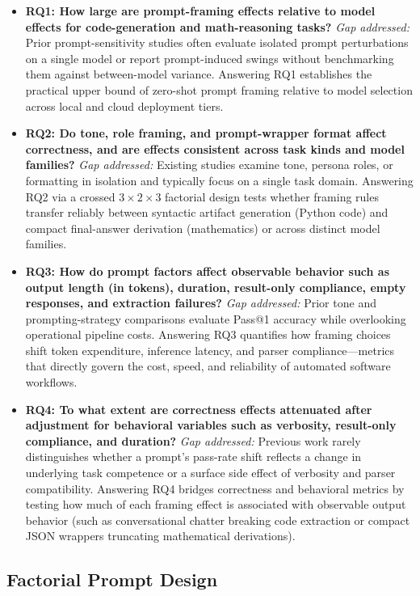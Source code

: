 \documentclass[a4paper,fleqn]{cas-sc}
\providecommand{\tightlist}{%
  \setlength{\itemsep}{0pt}\setlength{\parskip}{0pt}}
\begin{document}
\begin{itemize}
\tightlist
\item
  \textbf{RQ1: How large are prompt-framing effects relative to model effects for code-generation and math-reasoning tasks?}
  \emph{Gap addressed:} Prior prompt-sensitivity studies often evaluate isolated prompt perturbations on a single model or report prompt-induced swings without benchmarking them against between-model variance. Answering RQ1 establishes the practical upper bound of zero-shot prompt framing relative to model selection across local and cloud deployment tiers.
\item
  \textbf{RQ2: Do tone, role framing, and prompt-wrapper format affect correctness, and are effects consistent across task kinds and model families?}
  \emph{Gap addressed:} Existing studies examine tone, persona roles, or formatting in isolation and typically focus on a single task domain. Answering RQ2 via a crossed $3 \times 2 \times 3$ factorial design tests whether framing rules transfer reliably between syntactic artifact generation (Python code) and compact final-answer derivation (mathematics) or across distinct model families.
\item
  \textbf{RQ3: How do prompt factors affect observable behavior such as output length (in tokens), duration, result-only compliance, empty responses, and extraction failures?}
  \emph{Gap addressed:} Prior tone and prompting-strategy comparisons evaluate Pass@1 accuracy while overlooking operational pipeline costs. Answering RQ3 quantifies how framing choices shift token expenditure, inference latency, and parser compliance—metrics that directly govern the cost, speed, and reliability of automated software workflows.
\item
  \textbf{RQ4: To what extent are correctness effects attenuated after adjustment for behavioral variables such as verbosity, result-only compliance, and duration?}
  \emph{Gap addressed:} Previous work rarely distinguishes whether a prompt's pass-rate shift reflects a change in underlying task competence or a surface side effect of verbosity and parser compatibility. Answering RQ4 bridges correctness and behavioral metrics by testing how much of each framing effect is associated with observable output behavior (such as conversational chatter breaking code extraction or compact JSON wrappers truncating mathematical derivations).
\end{itemize}

\subsection{Factorial Prompt Design}\label{factorial-prompt-design}
\end{document}
